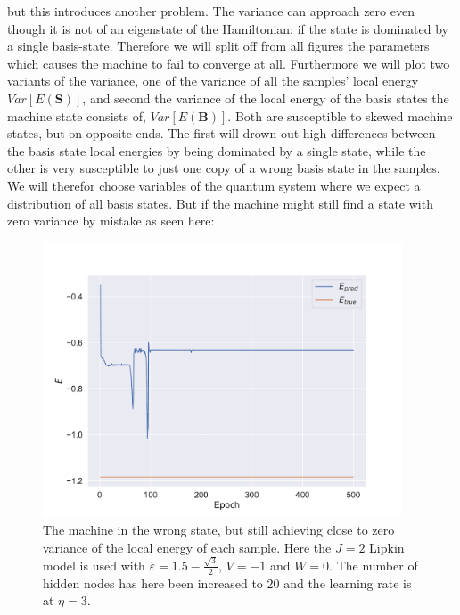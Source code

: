 but this introduces another problem. The variance can approach zero even though it is not of an eigenstate of the Hamiltonian: if the state is dominated by a single basis-state. Therefore we will split off from all figures the parameters which causes the machine to fail to converge at all. Furthermore we will plot two variants of the variance, one of the variance of all the samples' local energy $Var[E(\boldsymbol{S})]$, and second the variance of the local energy of the basis states the machine state consists of, $Var[E(\boldsymbol{B})]$. Both are susceptible to skewed machine states, but on opposite ends. The first will drown out high differences between the basis state local energies by being dominated by a single state, while the other is very susceptible to just one copy of a wrong basis state in the samples. We will therefor choose variables of the quantum system where we expect a distribution of all basis states. But if the machine might still find a state with zero variance by mistake as seen here:

\def \impJ {2}
\def \impeps {1.5 - \frac{\sqrt{3}}{2}}
\def \impV {-1}
\def \impW {0}
\def \impk {1}

\begin{figure}[H]
  \begin{center}
    \includegraphics[width=0.95\textwidth]{Figures/Plots/OPt/wrong_state.pdf}
  \end{center}
  \caption{The machine in the wrong state, but still achieving close to zero variance of the local energy of each sample. Here the $J = \impJ$ Lipkin model is used with $\varepsilon = \impeps$, $V = \impV$ and $W = \impW$. The number of hidden nodes has here been increased to $20$ and the learning rate is at $\eta = 3$.}\label{fig:wrong_state}
\end{figure}

